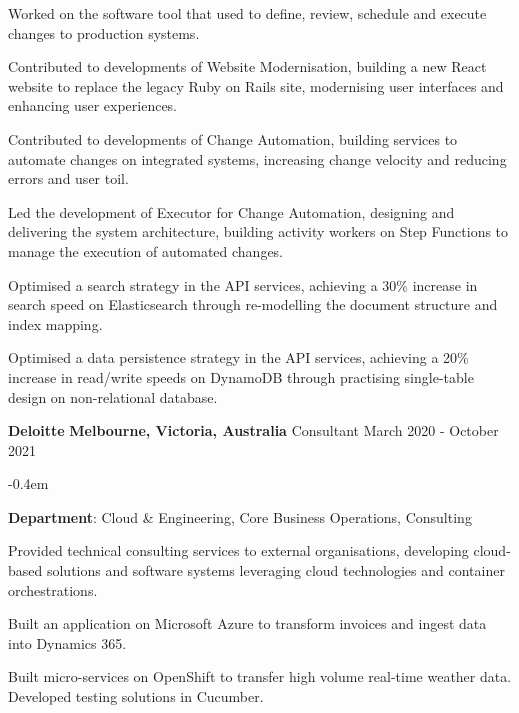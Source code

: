 \documentclass{cv}
\begin{document}
\begin{list}{}{\setlength{\leftmargin}{0em}}
\begin{list}{\raisebox{0.2em}{\tiny$\bullet$} \hspace{0em}}{\setlength{\leftmargin}{2.0em}}
        \item Worked on the software tool that used to define, review, schedule and execute changes to production systems.
        \item Contributed to developments of Website Modernisation, building a new React website to replace the legacy Ruby on Rails site, modernising user interfaces and enhancing user experiences.
        \item Contributed to developments of Change Automation, building services to automate changes on integrated systems, increasing change velocity and reducing errors and user toil.
        \item Led the development of Executor for Change Automation, designing and delivering the system architecture, building activity workers on Step Functions to manage the execution of automated changes.
        \item Optimised a search strategy in the API services, achieving a 30\% increase in search speed on Elasticsearch through re-modelling the document structure and index mapping.
        \item Optimised a data persistence strategy in the API services, achieving a 20\% increase in read/write speeds on DynamoDB through practising single-table design on non-relational database.
    \end{list}
\item
    \textbf{Deloitte} \hfill \textbf{Melbourne, Victoria, Australia}%
    \vspace{0.1em} \newline 
    {Consultant} \hfill {March 2020 - October 2021}%
    \begin{list}{\raisebox{0.2em}{\tiny$\bullet$} \hspace{0em}}{\setlength{\leftmargin}{2.0em}}
        \itemsep -0.4em \vspace{-0.4em}
        \item \textbf{Department}: Cloud \& Engineering, Core Business Operations, Consulting
        \item Provided technical consulting services to external organisations, developing cloud-based solutions and software systems leveraging cloud technologies and container orchestrations.
        \item Built an application on Microsoft Azure to transform invoices and ingest data into Dynamics 365.
        \item Built micro-services on OpenShift to transfer high volume real-time weather data. Developed testing solutions in Cucumber.

\end{list}
\end{list}
\end{document}

